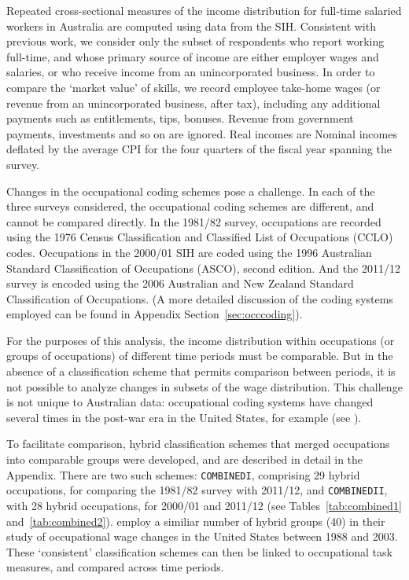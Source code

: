Repeated cross-sectional measures of the income distribution for full-time salaried workers in Australia are computed using data from the SIH. Consistent with previous work, we consider only the subset of respondents who report working full-time, and whose primary source of income are either employer wages and salaries, or who receive income from an unincorporated business. In order to compare the `market value' of skills, we record employee take-home wages (or revenue from an unincorporated business, after tax), including any additional payments such as entitlements, tips, bonuses. Revenue from government payments, investments and so on are ignored. Real incomes are Nominal incomes deflated by the average CPI for the four quarters of the fiscal year spanning the survey.

Changes in the occupational coding schemes pose a challenge. In each of the three surveys considered, the occupational coding schemes are different, and cannot be compared directly. In the 1981/82 survey, occupations are recorded using the 1976 Census Classification and Classified List of Occupations (CCLO) codes. Occupations in the 2000/01 SIH are coded using the 1996 Australian Standard Classification of Occupations (ASCO), second edition. And the 2011/12 survey is encoded using the 2006 Australian and New Zealand Standard Classification of Occupations. (A more detailed discussion of the coding systems employed can be found in Appendix Section~\ref{sec:occcoding}). 

For the purposes of this analysis, the income distribution within occupations (or groups of occupations) of different time periods must be comparable. But in the absence of a classification scheme that permits comparison between periods, it is not possible to analyze changes in subsets of the wage distribution. This challenge is not unique to Australian data: occupational coding systems have changed several times in the post-war era in the United States, for example (see \cite{Autor2012,Meyer2005}).

To facilitate comparison, hybrid classification schemes that merged occupations into comparable groups were developed, and are described in detail in the Appendix. There are two such schemes: {\tt COMBINEDI}, comprising 29 hybrid occupations, for comparing the 1981/82 survey with 2011/12, and {\tt COMBINEDII}, with 28 hybrid occupations, for 2000/01 and 2011/12 (see Tables~\ref{tab:combined1} and~\ref{tab:combined2}). \citet{Firpo2011} employ a similiar number of hybrid groups (40) in their study of occupational wage changes in the United States between 1988 and 2003. These `consistent' classification schemes can then be linked to occupational task measures, and compared across time periods.

